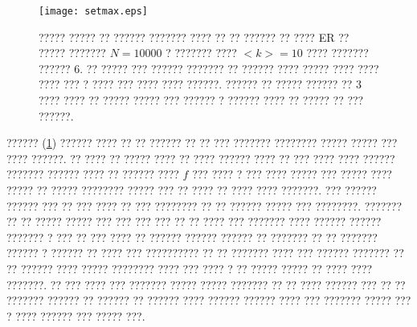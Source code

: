 \begin{figure}[htbp]
\hspace*{0cm}
\centering
\texttt{[image: setmax.eps]}
\caption [????? ????? ?? ?????? ??????? ???? ?? ?? ?????? ?? ???? $ER$ ?? ?????? ?????]{\footnotesize ????? ????? ?? ?????? ??????? ???? ?? ?? ?????? ?? ???? ER ?? ????? ??????? $N = 10000$ ? ??????? ???? $<k> = 10$ ???? ??????? ?????? $6$. ?? ????? ??? ?????? ??????? ?? ?????? ???? ????? ???? ???? ???? ??? ? ???? ??? ???? ???? ??????. ?????? ?? ????? ?????? ?? $3$ ???? ???? ?? ????? ????? ??? ?????? ? ?????? ???? ?? ????? ?? ??? ??????. }
\label{fig:ER1}
\end{figure}
?????? (\ref{fig:ER1}) ?????? ???? ?? ?? ?????? ?? ?? ??? ??????? ???????? ????? ????? ??? ???? ??????. ?? ???? ?? ????? ???? ?? ???? ?????? ???? ?? ??? ???? ???? ?????? ??????? ?????? ???? ?? ?????? ???? $f$ ??? ???? ? ??? ???? ????? ??? ????? ???? ????? ?? ????? ???????? ????? ??? ?? ???? ?? ???? ???? ???????. ??? ??????  ?????? ??? ?? ??? ???? ?? ??? ???????? ?? ?? ?????? ????? ??? ????????. ??????? ?? ?? ????? ????? ??? ??? ??? ??? ?? ?? ???? ??? ??????? ???? ?????? ?????? ??????? ? ??? ?? ??? ???? ?? ?????? ?????? ?????? ?? ??????? ?? ?? ??????? ?????? ? ?????? ?? ???? ??? ?????????? ?? ?? ??????? ???? ??? ?????? ??????? ?? ?? ?????? ???? ????? ???????? ???? ??? ???? ? ?? ????? ????? ?? ???? ???? ???????. ?? ??? ???? ??? ??????? ????? ????? ??????? ?? ?? ???? ?????? ??? ?? ?? ??????? ?????? ?? ?????? ?? ?????? ???? ?????? ?????? ???? ??? ??????? ????? ??? ? ???? ?????? ??? ????? ???. 




